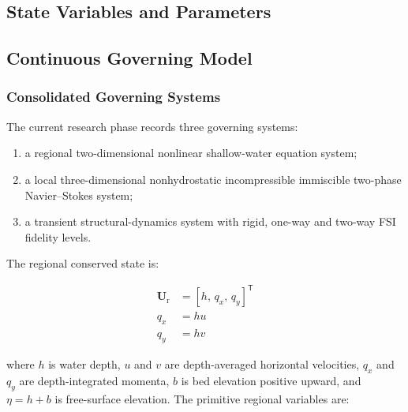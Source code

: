 
\subsection{State Variables and Parameters}
\label{sec:res-mod-eqs-state-variables-parameters}


\subsection{Continuous Governing Model}
\label{sec:res-mod-eqs-continuous-governing-model}


\subsubsection{Consolidated Governing Systems}
\label{sec:res-mod-eqs-consolidated-governing-systems}

The current research phase records three governing systems:

\begin{enumerate}
  \item a regional two-dimensional nonlinear shallow-water equation
    system;
  \item a local three-dimensional nonhydrostatic incompressible
    immiscible two-phase Navier--Stokes system;
  \item a transient structural-dynamics system with rigid, one-way
    and two-way FSI fidelity levels.
\end{enumerate}

The regional conserved state is:

\begin{align}
  \mathbf{U}_{\mathrm{r}}
  &=
  \left[
    h,\,
    q_x,\,
    q_y
  \right]^{\mathsf{T}}
  \label{eq:res-mod-eqs-regional-conserved-state}
  \\
  q_x
  &=
  h u
  \label{eq:res-mod-eqs-regional-x-discharge}
  \\
  q_y
  &=
  h v
  \label{eq:res-mod-eqs-regional-y-discharge}
\end{align}

where $h$ is water depth, $u$ and $v$ are depth-averaged horizontal
velocities, $q_x$ and $q_y$ are depth-integrated momenta, $b$ is bed
elevation positive upward, and $\eta=h+b$ is free-surface elevation.
The primitive regional variables are:

